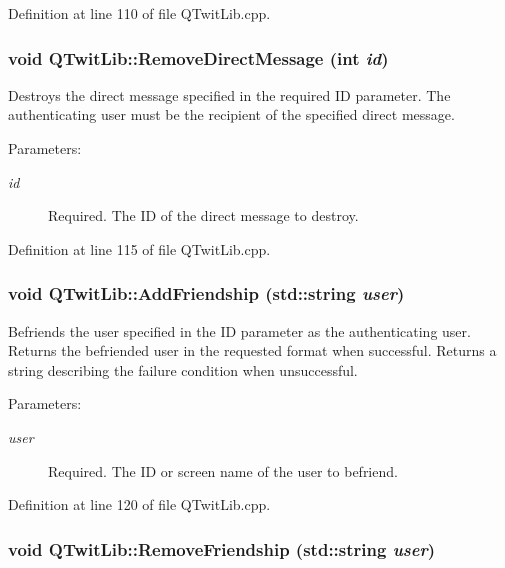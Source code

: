 Definition at line 110 of file QTwitLib.cpp.\hypertarget{classQTwitLib_a67bee8da6dc22a60d8d16ae02dda240}{
\subsubsection{\setlength{\rightskip}{0pt plus 5cm}void QTwitLib::RemoveDirectMessage (int {\em id})}}
\label{classQTwitLib_a67bee8da6dc22a60d8d16ae02dda240}


Destroys the direct message specified in the required ID parameter. The authenticating user must be the recipient of the specified direct message. \begin{Desc}
\item[Parameters:]
\begin{description}
\item[{\em id}]Required. The ID of the direct message to destroy. \end{description}
\end{Desc}


Definition at line 115 of file QTwitLib.cpp.\hypertarget{classQTwitLib_23d0817187f9fdb91310395e668b52ed}{
\subsubsection{\setlength{\rightskip}{0pt plus 5cm}void QTwitLib::AddFriendship (std::string {\em user})}}
\label{classQTwitLib_23d0817187f9fdb91310395e668b52ed}


Befriends the user specified in the ID parameter as the authenticating user. Returns the befriended user in the requested format when successful. Returns a string describing the failure condition when unsuccessful. \begin{Desc}
\item[Parameters:]
\begin{description}
\item[{\em user}]Required. The ID or screen name of the user to befriend. \end{description}
\end{Desc}


Definition at line 120 of file QTwitLib.cpp.\hypertarget{classQTwitLib_989786fb8d1d013fdffb11c5fff157e1}{
\subsubsection{\setlength{\rightskip}{0pt plus 5cm}void QTwitLib::RemoveFriendship (std::string {\em user})}}
\label{classQTwitLib_989786fb8d1d013fdffb11c5fff157e1}


